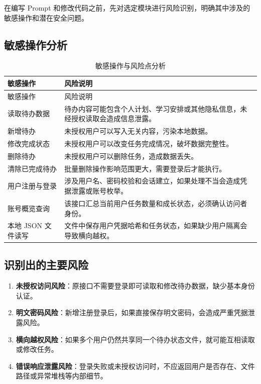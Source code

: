\documentclass[12pt,a4paper]{ctexart}
\begin{document}
在编写 Prompt 和修改代码之前，先对选定模块进行风险识别，明确其中涉及的敏感操作和潜在安全问题。

\subsection{敏感操作分析}

\begin{longtable}{C{4cm}Y}
    \caption{敏感操作与风险点分析}\\
    \toprule
    敏感操作 & 风险说明 \\
    \midrule
    \endfirsthead
    \toprule
    敏感操作 & 风险说明 \\
    \midrule
    \endhead
    读取待办数据 & 待办内容可能包含个人计划、学习安排或其他隐私信息，未经授权读取会造成信息泄露。 \\
    新增待办 & 未授权用户可以写入无关内容，污染本地数据。 \\
    修改完成状态 & 未授权用户可以改变任务完成情况，破坏数据完整性。 \\
    删除待办 & 未授权用户可以删除任务，造成数据丢失。 \\
    清除已完成待办 & 批量删除操作影响范围更大，需要登录后才能执行。 \\
    用户注册与登录 & 涉及用户名、密码校验和会话建立，如果处理不当会造成凭据泄露或账号枚举。 \\
    账号概览查询 & 该接口汇总当前用户任务数量和成长状态，必须确认访问者身份。 \\
    本地 JSON 文件读写 & 文件中保存用户凭据哈希和任务状态，如果缺少用户隔离会导致横向越权。 \\
    \bottomrule
\end{longtable}

\subsection{识别出的主要风险}

\begin{enumerate}[leftmargin=2.5em]
    \item \textbf{未授权访问风险}：原接口不需要登录即可读取和修改待办数据，缺少基本身份认证。
    \item \textbf{明文密码风险}：新增注册登录后，如果直接保存明文密码，会造成严重凭据泄露风险。
    \item \textbf{横向越权风险}：如果多个用户仍然共享同一个待办状态文件，就可能互相读取或修改任务。
    \item \textbf{错误响应泄露风险}：登录失败或未授权访问时，不应返回用户是否存在、文件路径或异常堆栈等内部细节。
\end{enumerate}
\end{document}

